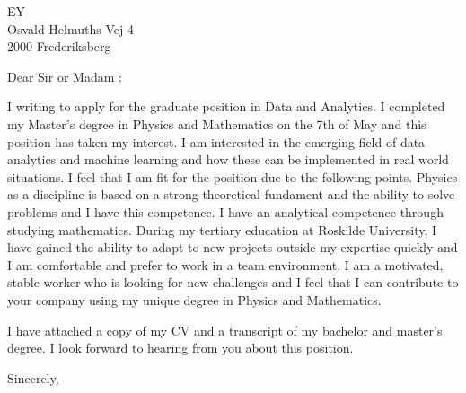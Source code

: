 \documentclass[10pt,a4paper]{letter}
\begin{document}
\begin{letter}{EY \\ Osvald Helmuths Vej 4 \\ 2000 Frederiksberg}
\opening{Dear Sir or Madam :}

I writing to apply for the graduate position in Data and Analytics. I completed my Master's degree in Physics and Mathematics on the 7th of May and this position has taken my interest. I am interested in the emerging field of data analytics and machine learning and how these can be implemented in real world situations. I feel that I am fit for the position due to the following points. Physics as a discipline is based on a strong theoretical fundament and the ability to solve problems and I have this competence. I have an analytical competence through studying mathematics. During my tertiary education at Roskilde University, I have gained the ability to adapt to new projects outside my expertise quickly and I am comfortable and prefer to work in a team environment. I am a motivated, stable worker who is looking for new challenges and I feel that I can contribute to your company using my unique degree in Physics and Mathematics. 

I have attached a copy of my CV and a transcript of my bachelor and master's degree. I look forward to hearing from you about this position.   

\closing{Sincerely,}

\end{letter}
\end{document}
